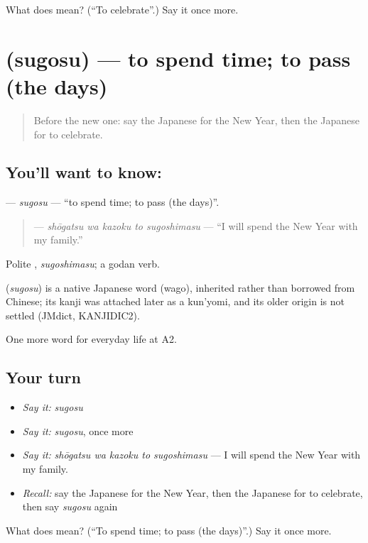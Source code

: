 \begin{tcolorbox}[breakable,colback=teal!4,colframe=teal!35!black,title={Before you move on}]
What does  mean? (\textquotedblleft{}To celebrate\textquotedblright{}.) Say it once more.
\end{tcolorbox}
\section[\texorpdfstring{\ja{すごす} (sugosu)}{すごす (sugosu)}]{ (sugosu) — to spend time; to pass (the days)}

\label{lesson:JA-C170-sugosu}



\begin{quote}
Before the new one: say the Japanese for the New Year, then the Japanese for to celebrate.
\end{quote}

\subsection*{You'll want to know: }
\textbf{} — \emph{sugosu} — \textquotedblleft{}to spend time; to pass (the days)\textquotedblright{}.

\begin{quote}
\textbf{  } — \emph{shōgatsu wa kazoku to sugoshimasu} — \textquotedblleft{}I will spend the New Year with my family.\textquotedblright{}
\end{quote}

Polite \textbf{}, \emph{sugoshimasu}; a godan verb.

\begin{cousinweb}
\textbf{} (\emph{sugosu}) is a native Japanese word (wago), inherited rather than borrowed from Chinese; its kanji was attached later as a kun'yomi, and its older origin is not settled (JMdict, KANJIDIC2).
\end{cousinweb}

\begin{grammarlens}[title={What you've built}]
One more word for everyday life at A2.
\end{grammarlens}

\subsection*{Your turn}
\begin{itemize}
\raggedright
  \item \emph{Say it:} \emph{sugosu}
  \item \emph{Say it:} \emph{sugosu}, once more
  \item \emph{Say it:} \emph{shōgatsu wa kazoku to sugoshimasu} — I will spend the New Year with my family.
  \item \emph{Recall:} say the Japanese for the New Year, then the Japanese for to celebrate, then say \emph{sugosu} again
\end{itemize}

\begin{tcolorbox}[breakable,colback=teal!4,colframe=teal!35!black,title={Before you move on}]
What does  mean? (\textquotedblleft{}To spend time; to pass (the days)\textquotedblright{}.) Say it once more.
\end{tcolorbox}
